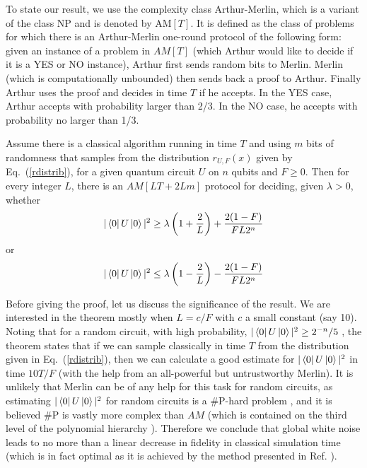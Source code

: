To state our result, we use the complexity class Arthur-Merlin, which is a variant of the class NP and is denoted by AM$[T]$. It is defined as the class of problems for which there is an Arthur-Merlin one-round protocol of the following form: given an instance of a problem in $AM[T]$ (which Arthur would like to decide if it is a YES or NO instance), Arthur first sends random bits to Merlin. Merlin (which is computationally unbounded) then sends back a proof to Arthur. Finally Arthur uses the proof and decides in time $T$ if he accepts. In the YES case, Arthur accepts with probability larger than 2/3. In the NO case, he accepts with probability no larger than 1/3. 


\begin{theorem} \label{globaldepolarizing}
Assume there is a classical algorithm running in time $T$ and using $m$ bits of randomness that samples from the distribution $r_{U, F}(x)$ given by Eq.~(\ref{rdistrib}), for a given quantum circuit $U$ on $n$ qubits and $F \geq 0$. Then for every integer $L$, there is an $AM[LT + 2Lm]$ protocol for deciding, given $\lambda > 0$, whether
\begin{equation}
 |\mathinner{\langle{0}|}U\mathinner{|{0}\rangle}|^2 \geq  \lambda \left(1 + \frac{2}{L}  \right)  +  \frac{2(1-F)}{F L2^n}  
\end{equation}
or 
\begin{equation}
|\mathinner{\langle{0}|}U\mathinner{|{0}\rangle}|^2 \leq \lambda \left(1 - \frac{2}{L}  \right)  -  \frac{2(1 - F)}{F L2^n}  
\end{equation}
\end{theorem}

Before giving the proof, let us discuss the significance of the result. We are interested in the theorem mostly when $L = c/F$ with $c$ a small constant (say 10). Noting that for a random circuit, with high probability, $|\mathinner{\langle{0}|}U\mathinner{|{0}\rangle}|^2 \geq  2^{-n}/5$ \cite{HM18}, the theorem states that if we can sample classically in time $T$ from the distribution given in Eq.~(\ref{rdistrib}), then we can calculate a good estimate for $|\mathinner{\langle{0}|}U\mathinner{|{0}\rangle}|^2$ in time $10T/F$ (with the help from an all-powerful but untrustworthy Merlin). It is unlikely that Merlin can be of any help for this task for random circuits, as estimating $|\mathinner{\langle{0}|}U\mathinner{|{0}\rangle}|^2$ for random circuits is a $\#\text{P}$-hard problem \cite{Bou19}, and it is believed $\#\text{P}$ is vastly more complex than $AM$ (which is contained on the third level of the polynomial hierarchy \cite{AB09}). Therefore we conclude that global white noise leads to no more than a linear decrease in fidelity in classical simulation time (which is in fact optimal as it is achieved by the method presented in Ref. \cite{markov_quantum_2018}). 


